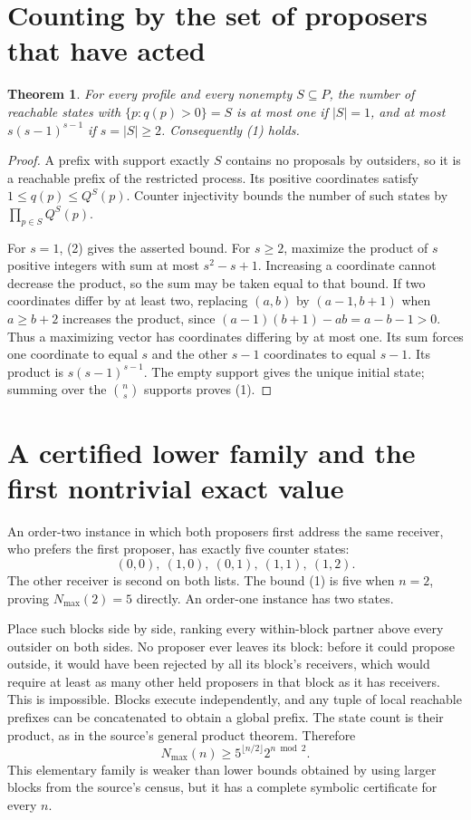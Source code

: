\documentclass[11pt]{article}
\newtheorem{theorem}{Theorem}
\theoremstyle{definition}
\begin{document}
\section*{Counting by the set of proposers that have acted}
\begin{theorem}
For every profile and every nonempty $S\subseteq P$, the number of
reachable states with $\{p:q(p)>0\}=S$ is at most one if $|S|=1$, and
at most $s(s-1)^{s-1}$ if $s=|S|\ge2$. Consequently (1) holds.
\end{theorem}
\begin{proof}
A prefix with support exactly $S$ contains no proposals by outsiders,
so it is a reachable prefix of the restricted process. Its positive
coordinates satisfy $1\le q(p)\le Q^S(p)$. Counter injectivity bounds
the number of such states by $\prod_{p\in S}Q^S(p)$.

For $s=1$, (2) gives the asserted bound. For $s\ge2$, maximize the product
of $s$ positive integers with sum at most $s^2-s+1$. Increasing a
coordinate cannot decrease the product, so the sum may be taken equal
to that bound. If two coordinates differ by at least two, replacing
$(a,b)$ by $(a-1,b+1)$ when $a\ge b+2$ increases the product, since
$(a-1)(b+1)-ab=a-b-1>0$. Thus a maximizing vector has coordinates
differing by at most one. Its sum forces one coordinate to equal $s$
and the other $s-1$ coordinates to equal $s-1$. Its product is
$s(s-1)^{s-1}$. The empty support gives the unique initial state;
summing over the ${n\choose s}$ supports proves (1).
\end{proof}

\section*{A certified lower family and the first nontrivial exact value}
An order-two instance in which both proposers first address the same
receiver, who prefers the first proposer, has exactly five counter states:
\[
 (0,0),\ (1,0),\ (0,1),\ (1,1),\ (1,2).
\]
The other receiver is second on both lists. The bound (1) is five when
$n=2$, proving $N_{\max}(2)=5$ directly. An order-one instance has two
states.

Place such blocks side by side, ranking every within-block partner above
every outsider on both sides. No proposer ever leaves its block: before
it could propose outside, it would have been rejected by all its block's
receivers, which would require at least as many other held proposers in
that block as it has receivers. This is impossible. Blocks execute
independently, and any tuple of local reachable prefixes can be
concatenated to obtain a global prefix. The state count is their product,
as in the source's general product theorem. Therefore
\[
 N_{\max}(n)\ge 5^{\lfloor n/2\rfloor}2^{n\bmod2}.       \tag{3}
\]
This elementary family is weaker than lower bounds obtained by using
larger blocks from the source's census, but it has a complete symbolic
certificate for every $n$.
\end{document}
